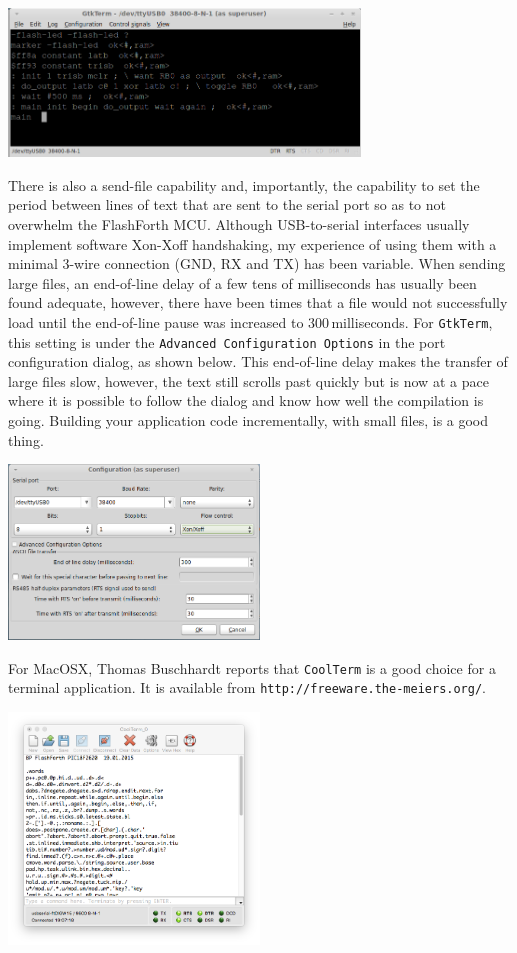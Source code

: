\documentclass[12pt,a4paper]{article}
\begin{document}
\medskip
\noindent
\begin{center}
\includegraphics[width=0.7\textwidth]{../figs/gtkterm-with-FF5p0-flash-led-pic18.png}
\end{center}

\medskip\noindent
There is also a send-file capability and, importantly, the capability to
set the period between lines of text that are sent to the serial port 
so as to not overwhelm the FlashForth MCU.
Although USB-to-serial interfaces usually implement software Xon-Xoff
handshaking, my experience of using them with a minimal 3-wire connection 
(GND, RX and TX) has been variable.
When sending large files, an end-of-line delay of a few tens of milliseconds 
has usually been found adequate, however, there have been times that a file 
would not successfully load until the end-of-line pause was increased to 300\,milliseconds.
For \verb!GtkTerm!, this setting is under the \verb!Advanced Configuration Options! 
in the port configuration dialog, as shown below.
This end-of-line delay makes the transfer of large files slow, however,
the text still scrolls past quickly but is now at a pace where it is possible to follow 
the dialog and know how well the compilation is going.
Building your application code incrementally, with small files, is a good thing.

\medskip
\noindent
\begin{center}
\includegraphics[width=0.5\textwidth]{../figs/gtkterm-configuration-dialog.png}
\end{center}

\medskip\noindent
For MacOSX, Thomas Buschhardt reports that \verb!CoolTerm! is a good choice for a terminal application.
It is available from \verb!http://freeware.the-meiers.org/!.

\medskip
\noindent
\begin{center}
\includegraphics[width=0.5\textwidth]{../figs/coolterm.png}
\end{center}
\end{document}
